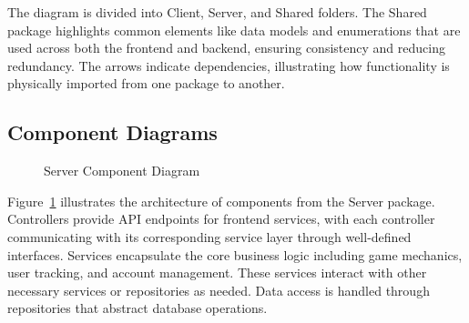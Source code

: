 \documentclass[11pt,a4paper]{article}
\newcommand{\inputdiagram}[1]{}
\newcommand{\textwidthdiagram}[2][1]{%
  \resizebox{#1\textwidth}{!}{\inputdiagram{#2}}%
}
\begin{document}
The diagram is divided into Client, Server, and Shared folders. The Shared package highlights common elements like data models and enumerations that are used across both the frontend and backend, ensuring consistency and reducing redundancy. The arrows indicate dependencies, illustrating how functionality is physically imported from one package to another.



\subsection{Component Diagrams}

\begin{figure}[H]
    \centering
    \textwidthdiagram{server_component_diagram.latex}
    \caption{Server Component Diagram}
    \label{fig:server_component_diagram}
\end{figure}

Figure~\ref{fig:server_component_diagram} illustrates the architecture of components from the Server package. Controllers provide API endpoints for frontend services, with each controller communicating with its corresponding service layer through well-defined interfaces. Services encapsulate the core business logic including game mechanics, user tracking, and account management. These services interact with other necessary services or repositories as needed. Data access is handled through repositories that abstract database operations.
\end{document}
